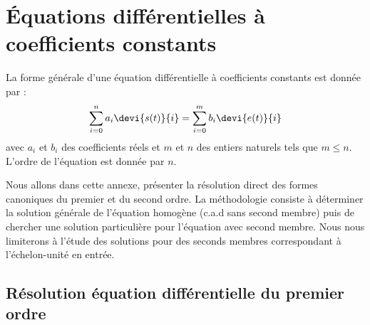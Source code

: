 \chapter{Équations différentielles à coefficients 
         constants\label{annexe-eqndiff}}
La forme générale d'une équation différentielle à coefficients constants est 
donnée par :
\begin{align}
\sum_{i=0}^{n}a_i\devi{s(t)}{i}=\sum_{i=0}^{m}b_i\devi{e(t)}{i}
\end{align}
avec $a_i$ et $b_i$ des coefficients réels et $m$ et $n$ des entiers naturels 
tels que $m\le n$. L'ordre de l'équation est donnée par $n$.

Nous allons dans cette annexe, présenter la résolution direct 
des formes canoniques du premier et du second ordre. La méthodologie consiste
à déterminer la solution générale de l'équation homogène (c.a.d sans second 
membre) puis de chercher une solution particulière pour l'équation avec second 
membre. Nous nous limiterons à l'étude des solutions pour des seconds membres 
correspondant à l'échelon-unité en entrée.

\section{Résolution équation différentielle du premier ordre}

